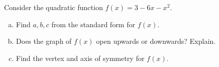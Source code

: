 \documentclass[11pt,letterpaper]{article}
\begin{document}

\problem Consider the quadratic function $f(x)= 3 - 6x - x^2$.
	\begin{enumerate}[(a)]
	\item Find $a, b, c$ from the standard form for $f(x)$.
	\item Does the graph of $f(x)$ open upwards or downwards? Explain.
	\item Find the vertex and axis of symmetry for $f(x)$.
	\end{enumerate}
\end{document}
